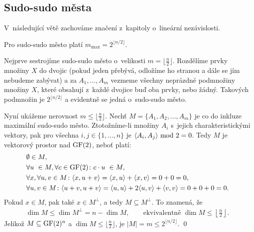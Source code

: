 \subsection{Sudo-sudo města}


V~následující větě zachováme značení z~kapitoly o~lineární nezávislosti.

\vt Pro sudo-sudo město platí $m_{\max} = 2^{\lfloor n / 2 \rfloor}$.

\dk Nejprve sestrojíme sudo-sudo město o~velikosti $m=\lfloor\frac n2\rfloor$. Rozdělíme prvky množiny $X$ do dvojic (pokud jeden přebývá, odložíme ho stranou a dále se jím nebudeme zabývat) a za $A_1,\dots,A_m$ vezmeme všechny neprázdné podmnožiny množiny $X$, které obsahují z~každé dvojice buď oba prvky, nebo žádný. Takových podmnožin je $2^{\lfloor n / 2 \rfloor}$ a evidentně se jedná o~sudo-sudo město.

Nyní ukážeme nerovnost $m\leq\lfloor\frac n2\rfloor$. Nechť $M=\{A_1, A_2, \dots, A_m\}$ je co do inkluze maximální sudo-sudo město. Ztotožníme-li množiny $A_i$ s~jejich charakteristickými vektory, pak pro všechna $i,j\in\{1,\dots,n\}$ je ${\langle A_i,A_j\rangle} \text{ mod }2=0$. Tedy $M$ je vektorový prostor nad $\mathrm{GF}(2)$, neboť platí:
\begin{align*}
	&\emptyset \in M, \\
	&\forall u~\in M, \forall c\in \mathrm{GF}(2)\colon c\cdot u~\in M, \\
	&\forall x, \forall u,v\in M\colon {\langle x, u+v\rangle} = {\langle x,u\rangle} + {\langle x,v\rangle} = 0 + 0 = 0, \\
	&\forall u,v \in M\colon {\langle u+v,u+v\rangle} = {\langle u,u\rangle} + 2{\langle u,v\rangle} + {\langle v,v\rangle} = 0 + 0 + 0 = 0.
\end{align*}
Pokud $x\in M$, pak také $x\in M^\bot$, a tedy $M\subseteq M^\bot$. To znamená, že
\begin{align}
\dim M\leq\dim M^\bot=n-\dim M, \qquad\text{ekvivalentně } \dim M\leq\left\lfloor\frac n2\right\rfloor.
\end{align}
Jelikož $M \subseteq\mathrm{GF}(2)^n$ a $\dim M \leq\lfloor\frac n2\rfloor$, je $|M|=m \leq 2^{\lfloor n/2\rfloor}$. \qed


